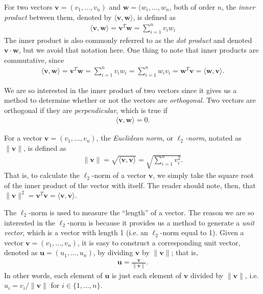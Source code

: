 \documentclass[10pt]{article}
\newcommand{\mydef}[1]{\textcolor{SteelBlue3}{\textit{#1}}} %
\begin{document}
For two vectors $\mathbf{v} = (v_1,\ldots,v_n)$ and $\mathbf{w}=(w_i,\ldots,w_n$, both of order $n$, the \mydef{inner product} between them, denoted by $\langle \mathbf{v}, \mathbf{w} \rangle$, is defined as 
\begin{align}
    \label{inprod}
    \langle \mathbf{v}, \mathbf{w} \rangle = \mathbf{v}^T \mathbf{w} = \sum_{i = 1}^n v_i w_i
\end{align}
The inner product is also commonly referred to as the \mydef{dot product} and denoted $\mathbf{v} \cdot \mathbf{w}$, but we avoid that notation here. One thing to note that inner products are commutative, since 
\begin{align*}
    \langle \mathbf{v}, \mathbf{w} \rangle = \mathbf{v}^T \mathbf{w} = \sum_{i = 1}^n v_i w_i = \sum_{i = 1}^n w_i v_i  = \mathbf{w}^T \mathbf{v} = \langle \mathbf{w}, \mathbf{v} \rangle.
\end{align*}

We are so interested in the inner product of two vectors since it gives us a method to determine whether or not the vectors are \mydef{orthogonal}. Two vectors are orthogonal if they are \mydef{perpendicular}, which is true if 
\begin{align}
    \label{orthogonal}
    \langle \mathbf{v},\mathbf{w} \rangle = 0.
\end{align}

For a vector $\mathbf{v} = (v_1,\ldots,v_n)$, the \mydef{Euclidean norm}, or \mydef{$\ell_2$-norm}, notated as $\| \mathbf{v} \|$, is defined as 
\begin{align}
    \label{eucnorm}
    \| \mathbf{v} \| = \sqrt{\langle \mathbf{v}, \mathbf{v} \rangle} = \sqrt{\sum_{i = 1}^n v_i^2}.
\end{align}
That is, to calculate the $\ell_2$-norm of a vector $\mathbf{v}$, we simply take the square root of the inner product of the vector with itself. The reader should note, then, that $\| \mathbf{v} \|^2 = \mathbf{v}^T \mathbf{v} = \langle \mathbf{v},\mathbf{v} \rangle$.

The $\ell_2$-norm is used to measure the ``length'' of a vector. The reason we are so interested in the $\ell_2$-norm is because it provides us a method to generate a \mydef{unit vector}, which is a vector with length 1 (i.e. an $\ell_2$-norm equal to 1). Given a vector $\mathbf{v} = (v_1,\ldots,v_n)$, it is easy to construct a corresponding unit vector, denoted as $\mathbf{u} = (u_1,\ldots,u_n)$, by dividing $\mathbf{v}$ by $\| \mathbf{v} \|$; that is, 
\begin{align}
    \label{unitvector}
    \mathbf{u} = \frac{\mathbf{v}}{\| \mathbf{v} \|}.
\end{align}
In other words, each element of $\mathbf{u}$ is just each element of $\mathbf{v}$ divided by $\| \mathbf{v} \|$, i.e. $u_i = v_i / \| \mathbf{v} \|$ for $i \in \{ 1,\ldots,n \}$.
\end{document}
